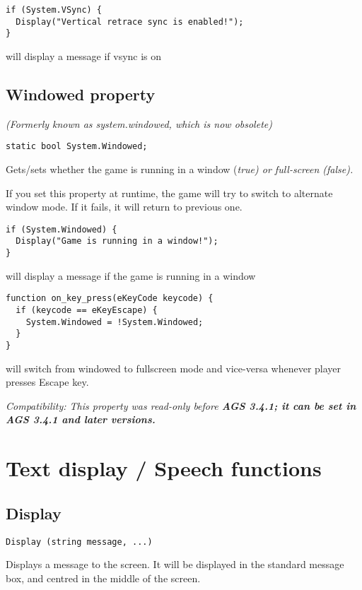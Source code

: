 \begin{verbatim}
if (System.VSync) {
  Display("Vertical retrace sync is enabled!");
}
\end{verbatim}
will display a message if vsync is on


\subsection{Windowed property}\label{System.Windowed}%

\it{(Formerly known as system.windowed, which is now obsolete)}

\begin{verbatim}
static bool System.Windowed;
\end{verbatim}
Gets/sets whether the game is running in a window (\it{true}) or
full-screen (\it{false}).

If you set this property at runtime, the game will try to switch to alternate window mode. If it fails, it will return to previous one.

\begin{verbatim}
if (System.Windowed) {
  Display("Game is running in a window!");
}
\end{verbatim}
will display a message if the game is running in a window

\begin{verbatim}
function on_key_press(eKeyCode keycode) {
  if (keycode == eKeyEscape) {
    System.Windowed = !System.Windowed;
  }
}
\end{verbatim}
will switch from windowed to fullscreen mode and vice-versa whenever player presses Escape key.

\it{Compatibility:} This property was read-only before \bf{AGS 3.4.1}; it can be set in \bf{AGS 3.4.1} and later versions.


\section{Text display / Speech functions}%

\subsection{Display}\label{Display}%

\begin{verbatim}
Display (string message, ...)
\end{verbatim}
Displays a message to the screen. It will be displayed in the standard
message box, and centred in the middle of the screen.

